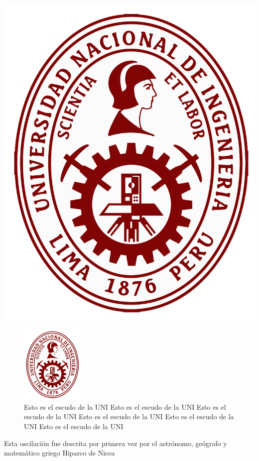 \documentclass[12pt,a4paper]{article}
\begin{document}
\begin{center}
\includegraphics[scale=0.1]{uni}
\end{center}

\begin{figure}[H]
	\centering
	\includegraphics[width=3cm]{uni}
	\caption[Escudo UNI]{Esto es el escudo de la UNI Esto es el escudo de la UNI Esto es el escudo de la UNI Esto es el escudo de la UNI Esto es el escudo de la UNI Esto es el escudo de la UNI}\label{fig2}
\end{figure}

Esta oscilación fue descrita por primera vez por el astrónomo, geógrafo y matemático griego Hiparco de Nicea 
\end{document}
